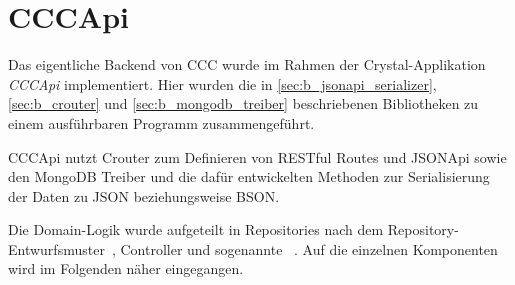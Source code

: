 \section{CCCApi}
\label{sec:b_cccapi}

Das eigentliche Backend von CCC wurde im Rahmen der Crystal-Applikation
\emph{CCCApi} implementiert.  Hier wurden die in
\cref{sec:b_jsonapi_serializer}, \ref{sec:b_crouter} und
\ref{sec:b_mongodb_treiber} beschriebenen Bibliotheken zu einem ausführbaren
Programm zusammengeführt.

CCCApi nutzt Crouter zum Definieren von RESTful Routes und JSONApi sowie den
MongoDB Treiber und die dafür entwickelten Methoden zur Serialisierung der
Daten zu JSON beziehungsweise BSON.

Die Domain-Logik wurde aufgeteilt in Repositories nach dem
Repository-Entwurfsmuster~\cite{repository-pattern}, Controller und sogenannte
~\cite{service-objects}.  Auf die einzelnen
Komponenten wird im Folgenden näher eingegangen.




